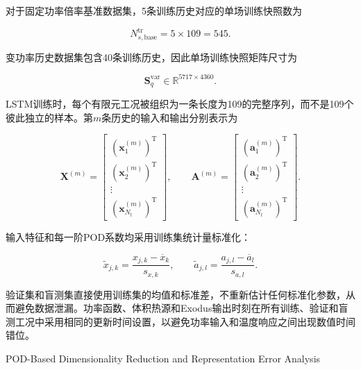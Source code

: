 对于固定功率倍率基准数据集，5条训练历史对应的单场训练快照数为

\begin{equation}
	N_{s,\mathrm{base}}^{\mathrm{tr}}
	=5\times109
	=545.
	\label{eq:baseline_training_snapshot_count}
\end{equation}

变功率历史数据集包含40条训练历史，因此单场训练快照矩阵尺寸为

\begin{equation}
	\boldsymbol S_q^{\mathrm{var}}
	\in
	\mathbb R^{5717\times4360}.
	\label{eq:formal_snapshot_matrix_size}
\end{equation}

LSTM训练时，每个有限元工况被组织为一条长度为109的完整序列，而不是109个彼此独立的样本。第$m$条历史的输入和输出分别表示为

\begin{equation}
	\boldsymbol X^{(m)}
	=
	\begin{bmatrix}
		(\boldsymbol x_1^{(m)})^{\mathrm T}\\
		(\boldsymbol x_2^{(m)})^{\mathrm T}\\
		\vdots\\
		(\boldsymbol x_{N_t}^{(m)})^{\mathrm T}
	\end{bmatrix},
	\qquad
	\boldsymbol A^{(m)}
	=
	\begin{bmatrix}
		(\boldsymbol a_1^{(m)})^{\mathrm T}\\
		(\boldsymbol a_2^{(m)})^{\mathrm T}\\
		\vdots\\
		(\boldsymbol a_{N_t}^{(m)})^{\mathrm T}
	\end{bmatrix}.
	\label{eq:formal_sequence_samples}
\end{equation}

输入特征和每一阶POD系数均采用训练集统计量标准化：

\begin{equation}
	\widetilde{x}_{j,k}
	=
	\frac{x_{j,k}-\overline{x}_k}{s_{x,k}},
	\qquad
	\widetilde{a}_{j,l}
	=
	\frac{a_{j,l}-\overline{a}_l}{s_{a,l}}.
	\label{eq:formal_standardization}
\end{equation}

验证集和盲测集直接使用训练集的均值和标准差，不重新估计任何标准化参数，从而避免数据泄漏。功率函数、体积热源和Exodus输出时刻在所有训练、验证和盲测工况中采用相同的更新时间设置，以避免功率输入和温度响应之间出现数值时间错位。

{POD-Based Dimensionality Reduction and Representation Error Analysis}

